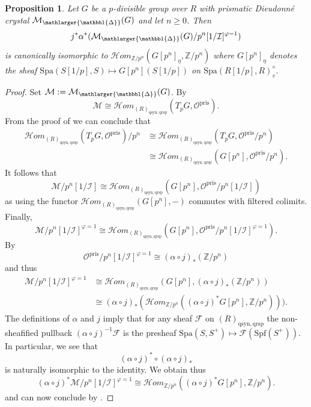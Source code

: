 \documentclass{amsart}
\newcommand{\prism}{{\mathlarger{\mathbbl{\Delta}}}}
\theoremstyle{plain}
\newtheorem{proposition}[theorem]{Proposition}
\theoremstyle{definition}
\newcommand{\pris}{\mathrm{pris}}
\newcommand{\Spa}{\mathrm{Spa}}
\newcommand{\Spf}{\mathrm{Spf}}
\newcommand{\Z}{\mathbb{Z}}
\newcommand{\red}[1]{{\color{black} #1}}
\begin{document}
\begin{proposition}
  \label{sec:etale-comparison-p-2-etale-comparison-for-prismatic-dieudonne-module-of-p-divisible-group}
  Let $G$ be a $p$-divisible group over $R$ with prismatic Dieudonn\'e crystal $\mathcal{M}_\prism(G)$ and let $n\geq 0$. Then
  $$
  j^\ast\alpha^\ast(\mathcal{M}_{\prism}(G)/p^n[1/\mathcal{I}]^{\varphi=1})
  $$
  is canonically isomorphic to $\mathcal{H}om_{\Z/p^n}(G[p^n]_{\eta},\Z/p^n)$ where $G[p^n]_\eta$ denotes the sheaf $\Spa(S[1/p],S)\mapsto G[p^n](S[1/p])$ on $\Spa(R[1/p],R)^\diamond_v$.
\end{proposition}
\begin{proof}
Set $\mathcal{M}:=\mathcal{M}_\prism(G)$. By 
  $$
  \mathcal{M}\cong \mathcal{H}om_{(R)_{\mathrm{qsyn},\mathrm{qrsp}}}(T_pG,\mathcal{O}^\pris).
  $$
  From the proof of  we can conclude that
\begin{equation*}
\begin{split}
  \mathcal{H}om_{(R)_{\mathrm{qsyn},\mathrm{qrsp}}}(T_pG,\mathcal{O}^\pris)/p^n & \cong  \mathcal{H}om_{(R)_{\mathrm{qsyn},\mathrm{qrsp}}}(T_pG,\mathcal{O}^\pris/p^n) \\
     &   \cong  \mathcal{H}om_{(R)_{\mathrm{qsyn},\mathrm{qrsp}}}(G[p^n],\mathcal{O}^\pris/p^n).
\end{split}
\end{equation*}
  It follows that
  $$
  \mathcal{M}/p^n[1/\mathcal{I}]\cong \mathcal{H}om_{(R)_{\mathrm{qsyn},\mathrm{qrsp}}}(G[p^n],\mathcal{O}^\pris/p^n[1/\mathcal{I}])
  $$
  as using  the functor $\mathcal{H}om_{(R)_{\mathrm{qsyn},\mathrm{qrsp}}}(G[p^n],-)$ commutes with filtered colimits.
  Finally,
  $$
\mathcal{M}/p^n[1/\mathcal{I}]^{\varphi=1}\cong \mathcal{H}om_{(R)_{\mathrm{qsyn},\mathrm{qrsp}}}(G[p^n],\mathcal{O}^\pris/p^n[1/\mathcal{I}]^{\varphi=1}).
$$
By 
$$
\mathcal{O}^\pris/p^n[1/\mathcal{I}]^{\varphi=1}\cong (\alpha\circ j)_{\ast}(\Z/p^n)
$$
and thus
\begin{equation*}
\begin{split}
\mathcal{M}/p^n[1/\mathcal{I}]^{\varphi=1} &\cong  \mathcal{H}om_{(R)_{\mathrm{qsyn},\mathrm{qrsp}}}(G[p^n],(\alpha\circ j)_\ast(\Z/p^n)) \\
& \cong (\alpha\circ j)_{\ast}(\mathcal{H}om_{\Z/p^n}((\alpha\circ j)^\ast G[p^n],\Z/p^n))). 
\end{split}
\end{equation*}
\red{The definitions of $\alpha$ and $j$ imply that for any sheaf $\mathcal{F}$ on $(R)_{\mathrm{qsyn, qrsp}}$ the non-sheafified pullback $(\alpha\circ j)^{-1}\mathcal{F}$ is the presheaf $\Spa(S,S^+) \mapsto \mathcal{F}(\Spf(S^+))$. In particular, we see that
\[
  (\alpha\circ j)^\ast\circ (\alpha\circ j)_\ast
\]
is naturally isomorphic to the identity. We obtain thus
$$
(\alpha\circ j)^\ast \mathcal{M}/p^n[1/\mathcal{I}]^{\varphi=1}\cong\mathcal{H}om_{\Z/p^n}((\alpha\circ j)^\ast G[p^n],\Z/p^n).
$$
and can now conclude by} .
\end{proof}
\end{document}
